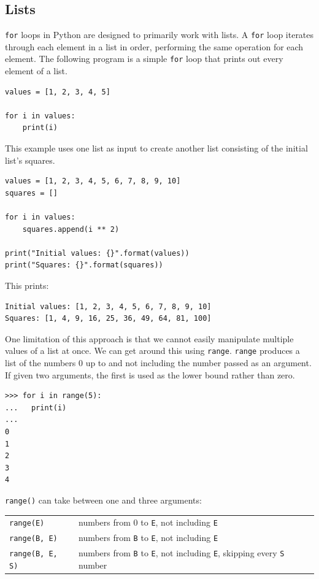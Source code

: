 \documentclass[11pt]{cselabheader}
\begin{document}
\subsection{Lists}
\lstinline{for} loops in Python are designed to primarily work with lists. A
\lstinline{for} loop iterates through each element in a list in order,
performing the same operation for each element. The following program is a
simple \lstinline{for} loop that prints out every element of a list.

\begin{lstlisting}[style=python]
values = [1, 2, 3, 4, 5]

for i in values:
    print(i)
\end{lstlisting}

This example uses one list as input to create another list consisting of the
initial list's squares.

\begin{lstlisting}[style=python]
values = [1, 2, 3, 4, 5, 6, 7, 8, 9, 10]
squares = []

for i in values:
    squares.append(i ** 2)

print("Initial values: {}".format(values))
print("Squares: {}".format(squares))
\end{lstlisting}

This prints:
\begin{lstlisting}[style=bash]
Initial values: [1, 2, 3, 4, 5, 6, 7, 8, 9, 10]
Squares: [1, 4, 9, 16, 25, 36, 49, 64, 81, 100]
\end{lstlisting}

One limitation of this approach is that we cannot easily manipulate multiple
values of a list at once. We can get around this using \lstinline{range}.
\lstinline{range} produces a list of the numbers 0 up to and not including the
number passed as an argument. If given two arguments, the first is used as the
lower bound rather than zero.

\begin{lstlisting}[style=ipython]
>>> for i in range(5):
...   print(i)
... 
0
1
2
3
4
\end{lstlisting}

\lstinline{range()} can take between one and three arguments:

\begin{tabular}{ll}
  \toprule
  \lstinline!range(E)! & numbers from 0 to \lstinline!E!, not including
  \lstinline!E! \\
  \lstinline!range(B, E)! & numbers from \lstinline!B! to \lstinline!E!, not
  including \lstinline!E! \\
  \lstinline!range(B, E, S)! & numbers from \lstinline!B! to \lstinline!E!, not
  including \lstinline!E!, skipping every \lstinline!S! number \\
  \bottomrule
\end{tabular}
\end{document}
